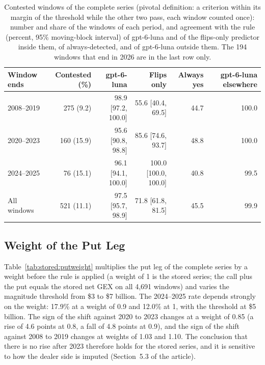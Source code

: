 \begin{table}[H]
\centering
\caption{Contested windows of the complete series (pivotal definition: a criterion within its margin of the threshold while the other two pass, each window counted once): number and share of the windows of each period, and agreement with the rule (percent, 95\% moving-block interval) of gpt-6-luna and of the flips-only predictor inside them, of always-detected, and of gpt-6-luna outside them. The 194 windows that end in 2026 are in the last row only.}
\label{tab:stored:contested}
\footnotesize
\begin{tabular}{@{}lrrrrr@{}}
\toprule
Window ends & Contested (\%) & gpt-6-luna & Flips only & Always yes & gpt-6-luna elsewhere \\
\midrule
2008--2019 & 275 (9.2) & 98.9 [97.2, 100.0] & 55.6 [40.4, 69.5] & 44.7 & 100.0 \\
2020--2023 & 160 (15.9) & 95.6 [90.8, 98.8] & 85.6 [74.6, 93.7] & 48.8 & 100.0 \\
2024--2025 & 76 (15.1) & 96.1 [94.1, 100.0] & 100.0 [100.0, 100.0] & 40.8 & 99.5 \\
All windows & 521 (11.1) & 97.5 [95.7, 98.9] & 71.8 [61.8, 81.5] & 45.5 & 99.9 \\
\bottomrule
\end{tabular}
\end{table}

\subsection{Weight of the Put Leg}
\label{sup:stored:e2}

Table~\ref{tab:stored:putweight} multiplies the put leg of the complete series by a weight before the rule is applied (a weight of 1 is the stored series; the call plus the put equals the stored net GEX on all 4{,}691 windows) and varies the magnitude threshold from \$3 to \$7 billion. The 2024--2025 rate depends strongly on the weight: 17.9\% at a weight of 0.9 and 12.0\% at 1, with the threshold at \$5 billion. The sign of the shift against 2020 to 2023 changes at a weight of 0.85 (a rise of 4.6 points at 0.8, a fall of 4.8 points at 0.9), and the sign of the shift against 2008 to 2019 changes at weights of 1.03 and 1.10. The conclusion that there is no rise after 2023 therefore holds for the stored series, and it is sensitive to how the dealer side is imputed (Section~5.3 of the article).

